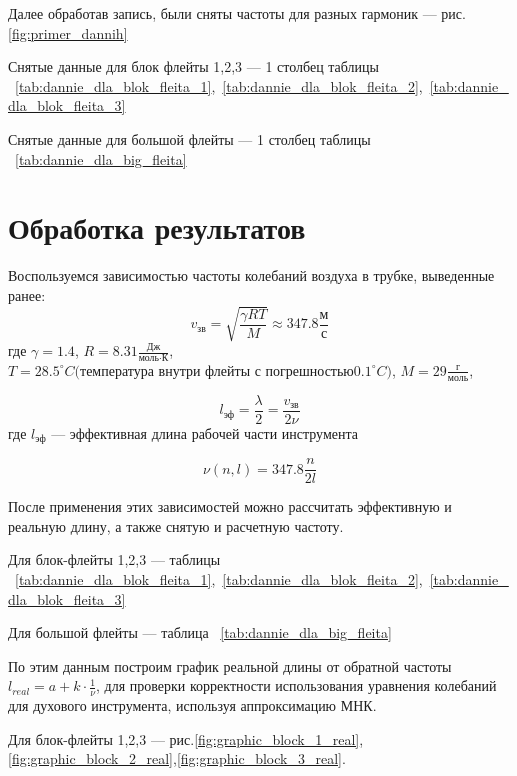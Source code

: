 Далее обработав запись, были сняты частоты для разных гармоник --- рис.\ref{fig:primer_dannih}

Снятые данные для блок флейты 1,2,3 --- 1 столбец таблицы ~\ref{tab:dannie_dla_blok_fleita_1},~\ref{tab:dannie_dla_blok_fleita_2},~\ref{tab:dannie_dla_blok_fleita_3}

Снятые данные для большой флейты --- 1 столбец таблицы ~\ref{tab:dannie_dla_big_fleita}

\newpage

\section{Обработка результатов}

Воспользуемся зависимостью частоты колебаний воздуха в трубке, выведенные ранее:
\begin{equation}
    v_{\text{зв}} = \sqrt{\frac{\gamma R T}{M}}\approx 347.8\frac{\text{м}}{\text{с}}
\end{equation}
где $\gamma = 1.4$, $R = 8.31 \frac{\text{Дж}}{\text{моль}\cdot\text{К}}$, $T = 28.5^\circ C\text{(температура внутри флейты с погрешностью}0.1^\circ C)$, $M = 29 \frac{\text{г}}{\text{моль}}$, 

\begin{equation}
    l_{\text{эф}} = \frac{\lambda}{2} = \frac{v_{\text{зв}}}{2\nu}
\end{equation}
где $l_{\text{эф}}$ --- эффективная длина рабочей части инструмента

\begin{equation}
    \nu(n,l) = 347.8\frac{n}{2l}
\end{equation}

После применения этих зависимостей можно рассчитать эффективную и реальную длину, а также снятую и расчетную частоту.

Для блок-флейты 1,2,3 --- таблицы ~\ref{tab:dannie_dla_blok_fleita_1},~\ref{tab:dannie_dla_blok_fleita_2},~\ref{tab:dannie_dla_blok_fleita_3}

Для большой флейты --- таблица ~\ref{tab:dannie_dla_big_fleita}

По этим данным построим график реальной длины от обратной частоты $l_{real} = a + k \cdot \frac{1}{\nu}$, 
для проверки корректности использования уравнения колебаний для духового инструмента, используя аппроксимацию МНК.

Для блок-флейты 1,2,3 --- рис.\ref{fig:graphic_block_1_real},\ref{fig:graphic_block_2_real},\ref{fig:graphic_block_3_real}.


